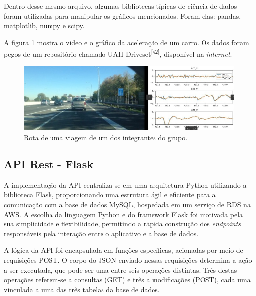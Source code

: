     Dentro desse mesmo arquivo, algumas bibliotecas típicas de ciência de dados foram utilizadas para manipular os gráficos mencionados. Foram elas: pandas, matplotlib, numpy e scipy.
    
    A figura \ref{fig:rota_uah_driveset} mostra o video e o gráfico da aceleração de um carro. Os dados foram pegos de um repositório chamado UAH-Driveset\textsuperscript{[42]}, disponível na \textit{internet}.
    
    \begin{figure}[hp]
        \centering
        
        \includegraphics[scale=0.6]{figures/rota_uah_driveset.jpg}
        
        \caption{Rota de uma viagem de um dos integrantes do grupo.}
        \label{fig:rota_uah_driveset}
    \end{figure}

    \subsection{API Rest - Flask}
    A implementação da API centraliza-se em uma arquitetura Python utilizando a biblioteca Flask, proporcionando uma estrutura ágil e eficiente para a comunicação com a base de dados MySQL, hospedada em um serviço de RDS na AWS. A escolha da linguagem Python e do framework Flask foi motivada pela sua simplicidade e flexibilidade, permitindo a rápida construção dos \textit{endpoints} responsáveis pela interação entre o aplicativo e a base de dados.

    A lógica da API foi encapsulada em funções específicas, acionadas por meio de requisições POST. O corpo do JSON enviado nessas requisições determina a ação a ser executada, que pode ser uma entre seis operações distintas. Três destas operações referem-se a consultas (GET) e três a modificações (POST), cada uma vinculada a uma das três tabelas da base de dados.


